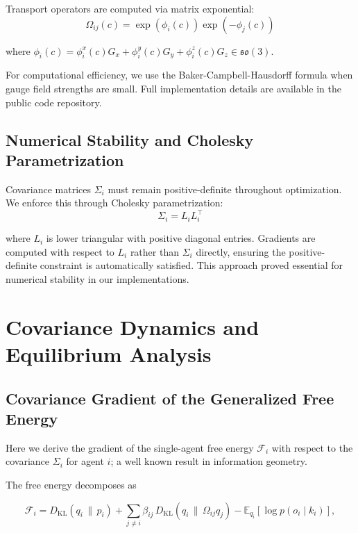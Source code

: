 \documentclass[11pt]{article}
\begin{document}
Transport operators are computed via matrix exponential:
\begin{equation}
\Omega_{ij}(c) = \exp(\phi_i(c)) \exp(-\phi_j(c))
\end{equation}

where $\phi_i(c) = \phi_i^x(c) G_x + \phi_i^y(c) G_y + \phi_i^z(c) G_z \in \mathfrak{so}(3)$.

For computational efficiency, we use the Baker-Campbell-Hausdorff formula when gauge field strengths are small. Full implementation details are available in the public code repository.

\subsection{Numerical Stability and Cholesky Parametrization}

Covariance matrices $\Sigma_i$ must remain positive-definite throughout optimization. We enforce this through Cholesky parametrization:
\begin{equation}
\Sigma_i = L_i L_i^\top
\end{equation}

where $L_i$ is lower triangular with positive diagonal entries. Gradients are computed with respect to $L_i$ rather than $\Sigma_i$ directly, ensuring the positive-definite constraint is automatically satisfied. This approach proved essential for numerical stability in our implementations.






\section{Covariance Dynamics and Equilibrium Analysis}
\label{app:covariance_dynamics}

\subsection{Covariance Gradient of the Generalized Free Energy}

Here we derive the gradient of the single-agent free energy $\mathcal{F}_i$ with respect to the covariance $\Sigma_i$ for agent $i$; a well known result in information geometry.

The free energy decomposes as

\begin{equation}
\mathcal{F}_i
=D_{\mathrm{KL}}(q_i \,\|\, p_i)
+ \sum_{j \neq i} \beta_{ij}\,
D_{\mathrm{KL}}(q_i \,\|\, \Omega_{ij} q_j)
- \mathbb{E}_{q_i}[\log p(o_i \mid k_i)],
\end{equation}
\end{document}
